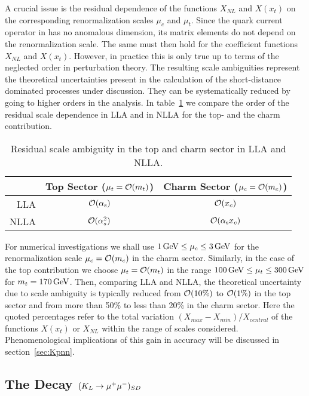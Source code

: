 A crucial issue is the residual dependence of the functions $X_{NL}$
and $X(x_t)$ on the corresponding renormalization scales $\mu_c$ and
$\mu_t$. Since the quark current operator in  has no
anomalous dimension, its matrix elements do not depend on the
renormalization scale. The same must then hold for the coefficient
functions $X_{NL}$ and $X(x_t)$. However, in practice this is only
true up to terms of the neglected order in perturbation theory.
The resulting scale ambiguities represent the theoretical uncertainties
present in the calculation of the short-distance dominated processes
under discussion. They can be systematically reduced by going to
higher orders in the analysis. In table~\ref{tab:scaledep} we compare
the order of the residual scale dependence in LLA and in NLLA for the
top- and the charm contribution.

\begin{table}[htb]
\caption[]{Residual scale ambiguity in the top and charm sector
in LLA and NLLA.
\label{tab:scaledep}}
\begin{center}
\begin{tabular}{|r|c|c|}
&Top Sector ($\mu_t={\cal O}(m_t)$) & Charm Sector ($\mu_c={\cal O}(m_c)$)
\\  \hline
LLA & ${\cal O}(\alpha_{\rm s})$&${\cal O}(x_c)$ \\  \hline
NLLA & ${\cal O}(\alpha^2_s)$&${\cal O}(\alpha_{\rm s} x_c)$
\end{tabular}
\end{center}
\end{table}

For numerical investigations we shall use $1\, {\rm GeV}\leq\mu_c\leq 3\, {\rm GeV}$
for the renormalization scale $\mu_c={\cal O}(m_c)$ in the charm sector.
Similarly, in the case of the top contribution we choose
$\mu_t={\cal O}(m_t)$ in the range $100\, {\rm GeV}\leq\mu_t\leq 300\, {\rm GeV}$ for
$m_t=170\, {\rm GeV}$. Then, comparing LLA and NLLA, the theoretical
uncertainty due to scale ambiguity is typically reduced from
${\cal O}(10\%)$ to ${\cal O}(1\%)$ in the top sector and from more than 50\%
to less than 20\% in the charm sector. Here the quoted percentages refer
to the total variation $(X_{max}-X_{min})/X_{central}$ of the functions
$X(x_t)$ or $X_{NL}$ within the range of scales considered.
Phenomenological implications of this gain in accuracy will be
discussed in section~\ref{sec:Kpnn}.

\subsection{The Decay $(K_L \to \mu^+\mu^-)_{SD}$}
            \label{sec:HeffRareKB:klmm}
